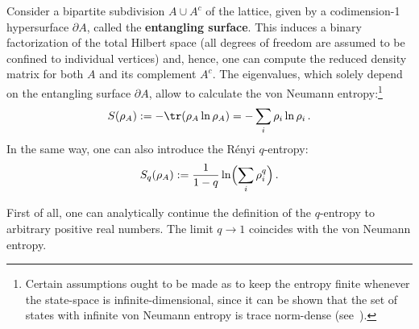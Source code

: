     Consider a bipartite subdivision $A\cup A^c$ of the lattice, given by a codimension-1 hypersurface $\partial A$, called the \textbf{entangling surface}. This induces a binary factorization of the total Hilbert space (all degrees of freedom are assumed to be confined to individual vertices) and, hence, one can compute the reduced density matrix for both $A$ and its complement $A^c$. The eigenvalues, which solely depend on the entangling surface $\partial A$, allow to calculate the von Neumann entropy:\footnote{Certain assumptions ought to be made as to keep the entropy finite whenever the state-space is infinite-dimensional, since it can be shown that the set of states with infinite von Neumann entropy is trace norm-dense (see~\citet{eisert_quantification_2002}).}
    \begin{gather}
        S(\rho_A) := -\tr(\rho_A\ln\rho_A) = -\sum_i\rho_i\ln\rho_i\,.
    \end{gather}
    In the same way, one can also introduce the R\'enyi $q$-entropy:
    \begin{gather}
        S_q(\rho_A) := \frac{1}{1-q}\ln\Bigl(\sum_i\rho_i^q\Bigr)\,.
    \end{gather}
    \begin{property}
         First of all, one can analytically continue the definition of the $q$-entropy to arbitrary positive real numbers. The limit $q\longrightarrow1$ coincides with the von Neumann entropy.
    \end{property}

